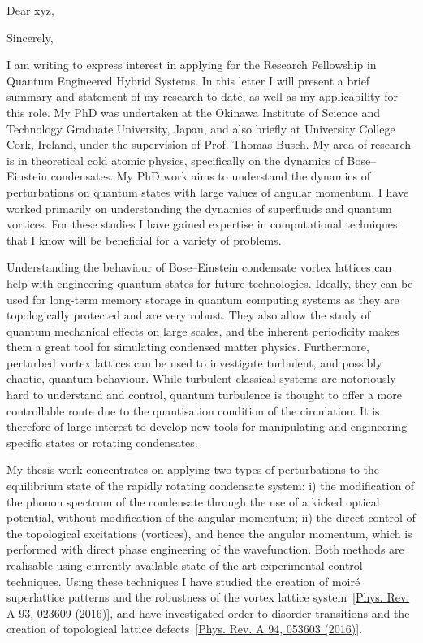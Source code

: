 \documentclass[12pt,a4paper,unicode]{moderncv}
\begin{document}
    \recipient{}{}
    \date{\today} %
    \opening{Dear xyz,}
    \closing{Sincerely,}
    \makelettertitle
{
    I am writing to express interest in applying for the Research Fellowship in Quantum Engineered Hybrid Systems. In this letter I will present a brief summary and statement of my research to date, as well as my applicability for this role. My PhD was undertaken at the Okinawa Institute of Science and Technology Graduate University, Japan, and also briefly at University College Cork, Ireland, under the supervision of Prof. Thomas Busch. My area of research is in theoretical cold atomic physics, specifically on the dynamics of Bose--Einstein condensates. My PhD work aims to understand the dynamics of perturbations on quantum states with large values of angular momentum. I have worked primarily on understanding the dynamics of superfluids and quantum vortices. For these studies I have gained expertise in computational techniques that I know will be beneficial for a variety of problems.

    Understanding the behaviour of Bose--Einstein condensate vortex lattices can help with engineering quantum states for future technologies. Ideally, they can be used for long-term memory storage in quantum computing systems as they are topologically protected and are very robust. They also allow the study of quantum mechanical effects on large scales, and the inherent periodicity makes them a great tool for simulating condensed matter physics. Furthermore, perturbed vortex lattices can be used to investigate turbulent, and possibly chaotic, quantum behaviour. While turbulent classical systems are notoriously hard to understand and control, quantum turbulence is thought to offer a more controllable route due to the quantisation condition of the circulation. It is therefore of large interest to develop new tools for manipulating and engineering specific states or rotating condensates.

    My thesis work concentrates on applying two types of perturbations to the equilibrium state of the rapidly rotating condensate system: i) the modification of the phonon spectrum of the condensate through the use of a kicked optical potential, without modification of the angular momentum; ii) the direct control of the topological excitations (vortices), and hence the angular momentum, which is performed with direct phase engineering of the wavefunction. Both methods are realisable using currently available state-of-the-art experimental control techniques. Using these techniques I have studied the creation of moir\'e superlattice patterns and the robustness of the vortex lattice system~[\href{http://journals.aps.org/pra/abstract/10.1103/PhysRevA.93.023609}{Phys. Rev. A 93, 023609 (2016)}], and have investigated order-to-disorder transitions and the creation of topological lattice defects~[\href{http://journals.aps.org/pra/abstract/10.1103/PhysRevA.94.053603}{Phys. Rev. A 94, 053603 (2016)}].

}
\end{document}
